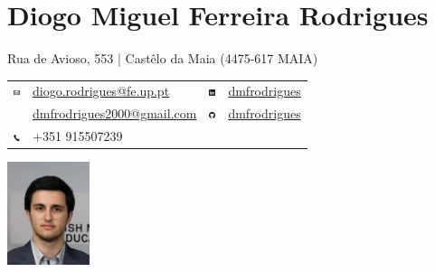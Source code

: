 \documentclass[8pt]{extarticle}
\begin{document}
\thispagestyle{empty}
\noindent
\begin{minipage}[l]{0.75\textwidth}
	\section*{Diogo Miguel Ferreira Rodrigues}
	Rua de Avioso, 553 | Castêlo da Maia (4475-617 MAIA)\\
    \begin{tabular}{@{}c @{\hskip 0.5em} l @{\hskip 5em} c @{\hskip 0.5em} l @{}}
        \includegraphics[height=7px]{email.png}    & \href{mailto:diogo.rodrigues@fe.up.pt}{diogo.rodrigues@fe.up.pt}     & \includegraphics[height=7px]{linkedin.png} & \href{https://www.linkedin.com/in/dmfrodrigues/}{dmfrodrigues} \\
                                                   & \href{mailto:dmfrodrigues2000@gmail.com}{dmfrodrigues2000@gmail.com} & \includegraphics[height=7px]{github.png}   & \href{https://github.com/dmfrodrigues}{dmfrodrigues}\\
        \includegraphics[height=7px]{phone.png}    & +351 915507239 \\
    \end{tabular}
\end{minipage}%
\begin{minipage}[l]{0.24\textwidth}
	\begin{center} \includegraphics[height=30mm]{cv_photo.jpg} \end{center}
\end{minipage}
\end{document}
